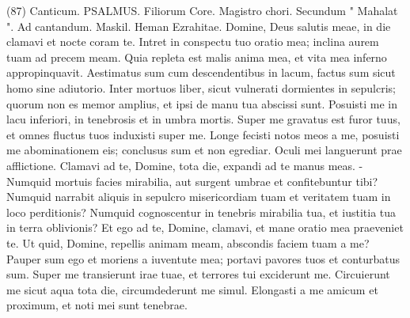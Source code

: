 \begin{biblechapter}  (87) 
\verse  Canticum. PSALMUS. Filiorum Core. Magistro chori. Secundum " Mahalat ". Ad cantandum. Maskil. Heman Ezrahitae. 
\verse Domine, Deus salutis meae, in die clamavi et nocte coram te. 
\verse Intret in conspectu tuo oratio mea; inclina aurem tuam ad precem meam. 
\verse Quia repleta est malis anima mea, et vita mea inferno appropinquavit. 
\verse Aestimatus sum cum descendentibus in lacum, factus sum sicut homo sine adiutorio. 
\verse Inter mortuos liber, sicut vulnerati dormientes in sepulcris; quorum non es memor amplius, et ipsi de manu tua abscissi sunt. 
\verse Posuisti me in lacu inferiori, in tenebrosis et in umbra mortis. 
\verse Super me gravatus est furor tuus, et omnes fluctus tuos induxisti super me. 
\verse Longe fecisti notos meos a me, posuisti me abominationem eis; conclusus sum et non egrediar. 
\verse Oculi mei languerunt prae afflictione. Clamavi ad te, Domine, tota die, expandi ad te manus meas. - 
\verse Numquid mortuis facies mirabilia, aut surgent umbrae et confitebuntur tibi? 
\verse Numquid narrabit aliquis in sepulcro misericordiam tuam et veritatem tuam in loco perditionis? 
\verse Numquid cognoscentur in tenebris mirabilia tua, et iustitia tua in terra oblivionis? 
\verse Et ego ad te, Domine, clamavi, et mane oratio mea praeveniet te. 
\verse Ut quid, Domine, repellis animam meam, abscondis faciem tuam a me? 
\verse Pauper sum ego et moriens a iuventute mea; portavi pavores tuos et conturbatus sum. 
\verse Super me transierunt irae tuae, et terrores tui exciderunt me. 
\verse Circuierunt me sicut aqua tota die, circumdederunt me simul. 
\verse Elongasti a me amicum et proximum, et noti mei sunt tenebrae. 
\end{biblechapter}

